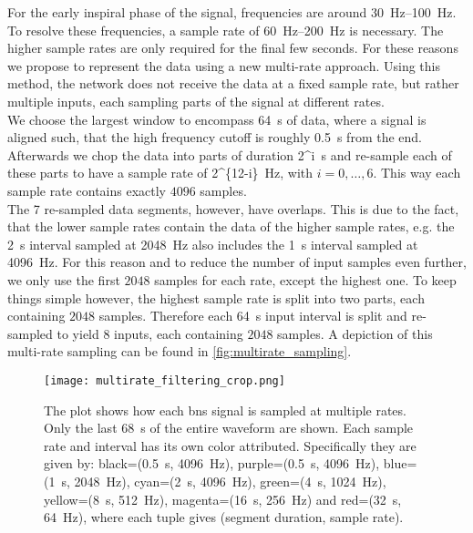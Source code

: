 For the early inspiral phase of the signal, frequencies are around \SIrange{30}{100}{\hertz}. To resolve these frequencies, a sample rate of \SIrange{60}{200}{\hertz} is necessary. The higher sample rates are only required for the final few seconds. For these reasons we propose to represent the data using a new multi-rate approach. Using this method, the network does not receive the data at a fixed sample rate, but rather multiple inputs, each sampling parts of the signal at different rates.\\
We choose the largest window to encompass \SI{64}{\s} of data, where a signal is aligned such, that the high frequency cutoff is roughly \SI{0.5}{\s} from the end. Afterwards we chop the data into parts of duration \SI[parse-numbers=false]{2^i}{\s} and re-sample each of these parts to have a sample rate of \SI[parse-numbers=false]{2^{12-i}}{\hertz}, with $i=0,\dotsc ,6$. This way each sample rate contains exactly $4096$ samples.\\
The 7 re-sampled data segments, however, have overlaps. This is due to the fact, that the lower sample rates contain the data of the higher sample rates, e.g. the \SI{2}{\s} interval sampled at \SI{2048}{\hertz} also includes the \SI{1}{\s} interval sampled at \SI{4096}{\hertz}. For this reason and to reduce the number of input samples even further, we only use the first $2048$ samples for each rate, except the highest one. To keep things simple however, the highest sample rate is split into two parts, each containing $2048$ samples. Therefore each \SI{64}{\s} input interval is split and re-sampled to yield 8 inputs, each containing $2048$ samples. A depiction of this multi-rate sampling can be found in \autoref{fig:multirate_sampling}.
\begin{figure}
\centering
\texttt{[image: multirate\_filtering\_crop.png]}
\caption[Multi-rate sampling]{The plot shows how each \gls{bns} signal is sampled at multiple rates. Only the last \SI{68}{\s} of the entire waveform are shown. Each sample rate and interval has its own color attributed. Specifically they are given by: black=(\SI{0.5}{\s}, \SI{4096}{\hertz}), purple=(\SI{0.5}{\s}, \SI{4096}{\hertz}), blue=(\SI{1}{\s}, \SI{2048}{\hertz}), cyan=(\SI{2}{\s}, \SI{4096}{\hertz}), green=(\SI{4}{\s}, \SI{1024}{\hertz}), yellow=(\SI{8}{\s}, \SI{512}{\hertz}), magenta=(\SI{16}{\s}, \SI{256}{\hertz}) and red=(\SI{32}{\s}, \SI{64}{\hertz}), where each tuple gives (segment duration, sample rate).}\label{fig:multirate_sampling}
\end{figure}
